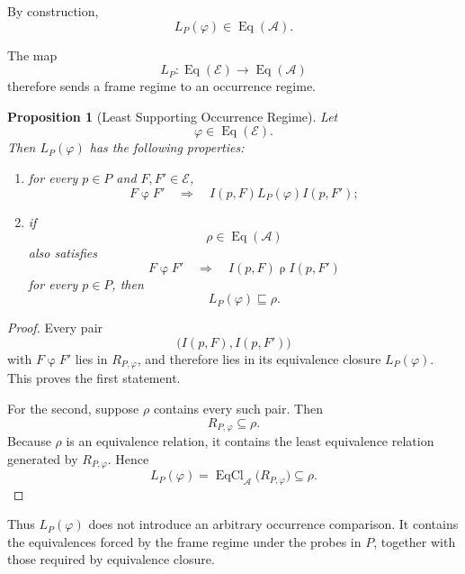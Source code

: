\documentclass[11pt]{article}
\theoremstyle{plain}
\newtheorem{proposition}[theorem]{Proposition}
\theoremstyle{definition}
\theoremstyle{remark}
\begin{document}
By construction,
\[
  L_P(\varphi)
  \in
  \operatorname{Eq}(\mathcal{A}).
\]

The map
\[
  L_P:
  \operatorname{Eq}(\mathcal{E})
  \longrightarrow
  \operatorname{Eq}(\mathcal{A})
\]
therefore sends a frame regime
to an occurrence regime.

\begin{proposition}[Least Supporting Occurrence Regime]
  \label{ik.prop.least-supporting}
  Let
  \[
    \varphi
    \in
    \operatorname{Eq}(\mathcal{E}).
  \]
  Then \(L_P(\varphi)\) has the following properties:
  \begin{enumerate}[label=(\alph*)]
    \item for every \(p\in P\) and \(F,F'\in\mathcal{E}\),
          \[
            F\mathrel{\varphi}F'
            \quad\Longrightarrow\quad
            I(p,F)
            \mathrel{L_P(\varphi)}
            I(p,F');
          \]
    \item if
          \[
            \rho
            \in
            \operatorname{Eq}(\mathcal{A})
          \]
          also satisfies
          \[
            F\mathrel{\varphi}F'
            \quad\Longrightarrow\quad
            I(p,F)\mathrel{\rho}I(p,F')
          \]
          for every \(p\in P\),
          then
          \[
            L_P(\varphi)
            \sqsubseteq
            \rho.
          \]
  \end{enumerate}
\end{proposition}

\begin{proof}
  Every pair
  \[
    \bigl(
    I(p,F),
    I(p,F')
    \bigr)
  \]
  with \(F\mathrel{\varphi}F'\)
  lies in \(R_{P,\varphi}\),
  and therefore lies in its equivalence closure
  \(L_P(\varphi)\).
  This proves the first statement.

  For the second,
  suppose \(\rho\) contains every such pair.
  Then
  \[
    R_{P,\varphi}
    \subseteq
    \rho.
  \]
  Because \(\rho\) is an equivalence relation,
  it contains the least equivalence relation
  generated by \(R_{P,\varphi}\).
  Hence
  \[
    L_P(\varphi)
    =
    \operatorname{EqCl}_{\mathcal{A}}
    \bigl(
    R_{P,\varphi}
    \bigr)
    \subseteq
    \rho.
  \]
\end{proof}

Thus \(L_P(\varphi)\)
does not introduce an arbitrary occurrence comparison.
It contains the equivalences forced
by the frame regime under the probes in \(P\),
together with those required by equivalence closure.
\end{document}
